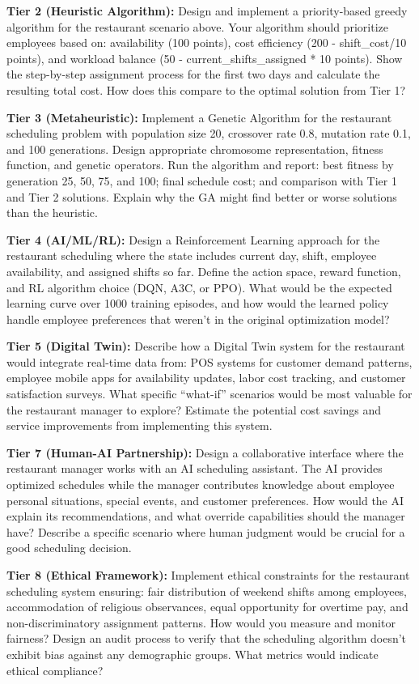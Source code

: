 \documentclass{article}
\begin{document}
\textbf{Tier 2 (Heuristic Algorithm):}
Design and implement a priority-based greedy algorithm for the restaurant scenario above. Your algorithm should prioritize employees based on: availability (100 points), cost efficiency (200 - shift\_cost/10 points), and workload balance (50 - current\_shifts\_assigned * 10 points). Show the step-by-step assignment process for the first two days and calculate the resulting total cost. How does this compare to the optimal solution from Tier 1?

\textbf{Tier 3 (Metaheuristic):}
Implement a Genetic Algorithm for the restaurant scheduling problem with population size 20, crossover rate 0.8, mutation rate 0.1, and 100 generations. Design appropriate chromosome representation, fitness function, and genetic operators. Run the algorithm and report: best fitness by generation 25, 50, 75, and 100; final schedule cost; and comparison with Tier 1 and Tier 2 solutions. Explain why the GA might find better or worse solutions than the heuristic.

\textbf{Tier 4 (AI/ML/RL):}
Design a Reinforcement Learning approach for the restaurant scheduling where the state includes current day, shift, employee availability, and assigned shifts so far. Define the action space, reward function, and RL algorithm choice (DQN, A3C, or PPO). What would be the expected learning curve over 1000 training episodes, and how would the learned policy handle employee preferences that weren't in the original optimization model?

\textbf{Tier 5 (Digital Twin):}
Describe how a Digital Twin system for the restaurant would integrate real-time data from: POS systems for customer demand patterns, employee mobile apps for availability updates, labor cost tracking, and customer satisfaction surveys. What specific ``what-if'' scenarios would be most valuable for the restaurant manager to explore? Estimate the potential cost savings and service improvements from implementing this system.

\textbf{Tier 7 (Human-AI Partnership):}
Design a collaborative interface where the restaurant manager works with an AI scheduling assistant. The AI provides optimized schedules while the manager contributes knowledge about employee personal situations, special events, and customer preferences. How would the AI explain its recommendations, and what override capabilities should the manager have? Describe a specific scenario where human judgment would be crucial for a good scheduling decision.

\textbf{Tier 8 (Ethical Framework):}
Implement ethical constraints for the restaurant scheduling system ensuring: fair distribution of weekend shifts among employees, accommodation of religious observances, equal opportunity for overtime pay, and non-discriminatory assignment patterns. How would you measure and monitor fairness? Design an audit process to verify that the scheduling algorithm doesn't exhibit bias against any demographic groups. What metrics would indicate ethical compliance?
\end{document}
